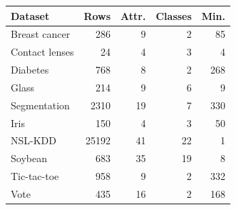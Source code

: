 \begin{tabular}{lrrrr}
\toprule
Dataset & Rows & Attr. & Classes & Min. \\
\midrule
Breast cancer & 286 & 9 & 2 & 85 \\
Contact lenses & 24 & 4 & 3 & 4 \\
Diabetes & 768 & 8 & 2 & 268 \\
Glass & 214 & 9 & 6 & 9 \\
Segmentation & 2310 & 19 & 7 & 330 \\
Iris & 150 & 4 & 3 & 50 \\
NSL-KDD & 25192 & 41 & 22 & 1 \\
Soybean & 683 & 35 & 19 & 8 \\
Tic-tac-toe & 958 & 9 & 2 & 332 \\
Vote & 435 & 16 & 2 & 168 \\
\bottomrule
\end{tabular}

